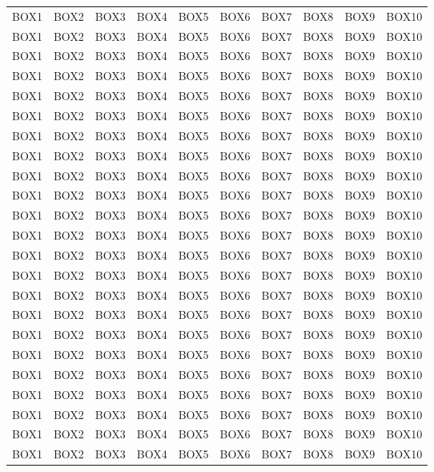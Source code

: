 \begin{landscape}
\begin{longtable}[c]{c|c|c|c|c|c|c|c|c|c}
	BOX1 & BOX2 & BOX3 & BOX4 & BOX5 & BOX6 & BOX7 & BOX8 & BOX9 & BOX10 \\
	BOX1 & BOX2 & BOX3 & BOX4 & BOX5 & BOX6 & BOX7 & BOX8 & BOX9 & BOX10 \\
	BOX1 & BOX2 & BOX3 & BOX4 & BOX5 & BOX6 & BOX7 & BOX8 & BOX9 & BOX10 \\
	BOX1 & BOX2 & BOX3 & BOX4 & BOX5 & BOX6 &	BOX7 & BOX8 & BOX9 & BOX10 \\
	BOX1 & BOX2 & BOX3 & BOX4 & BOX5 & BOX6 &	BOX7 & BOX8 & BOX9 & BOX10 \\
	BOX1 & BOX2 & BOX3 & BOX4 & BOX5 & BOX6 &	BOX7 & BOX8 & BOX9 & BOX10 \\
	BOX1 & BOX2 & BOX3 & BOX4 & BOX5 & BOX6 &	BOX7 & BOX8 & BOX9 & BOX10 \\
	BOX1 & BOX2 & BOX3 & BOX4 & BOX5 & BOX6 &	BOX7 & BOX8 & BOX9 & BOX10 \\
	BOX1 & BOX2 & BOX3 & BOX4 & BOX5 & BOX6 &	BOX7 & BOX8 & BOX9 & BOX10 \\
	BOX1 & BOX2 & BOX3 & BOX4 & BOX5 & BOX6 &	BOX7 & BOX8 & BOX9 & BOX10 \\
	BOX1 & BOX2 & BOX3 & BOX4 & BOX5 & BOX6 & BOX7 & BOX8 & BOX9 & BOX10 \\
	BOX1 & BOX2 & BOX3 & BOX4 & BOX5 & BOX6 &	BOX7 & BOX8 & BOX9 & BOX10 \\
	BOX1 & BOX2 & BOX3 & BOX4 & BOX5 & BOX6 &	BOX7 & BOX8 & BOX9 & BOX10 \\
	BOX1 & BOX2 & BOX3 & BOX4 & BOX5 & BOX6 &	BOX7 & BOX8 & BOX9 & BOX10 \\
	BOX1 & BOX2 & BOX3 & BOX4 & BOX5 & BOX6 &	BOX7 & BOX8 & BOX9 & BOX10 \\
	BOX1 & BOX2 & BOX3 & BOX4 & BOX5 & BOX6 &	BOX7 & BOX8 & BOX9 & BOX10 \\
	BOX1 & BOX2 & BOX3 & BOX4 & BOX5 & BOX6 &	BOX7 & BOX8 & BOX9 & BOX10 \\
	BOX1 & BOX2 & BOX3 & BOX4 & BOX5 & BOX6 &	BOX7 & BOX8 & BOX9 & BOX10 \\
	BOX1 & BOX2 & BOX3 & BOX4 & BOX5 & BOX6 &	BOX7 & BOX8 & BOX9 & BOX10 \\                                 
	BOX1 & BOX2 & BOX3 & BOX4 & BOX5 & BOX6 &	BOX7 & BOX8 & BOX9 & BOX10 \\
	BOX1 & BOX2 & BOX3 & BOX4 & BOX5 & BOX6 &	BOX7 & BOX8 & BOX9 & BOX10 \\
	BOX1 & BOX2 & BOX3 & BOX4 & BOX5 & BOX6 &	BOX7 & BOX8 & BOX9 & BOX10 \\
	BOX1 & BOX2 & BOX3 & BOX4 & BOX5 & BOX6 &	BOX7 & BOX8 & BOX9 & BOX10 \\

\end{longtable}
\end{landscape}
